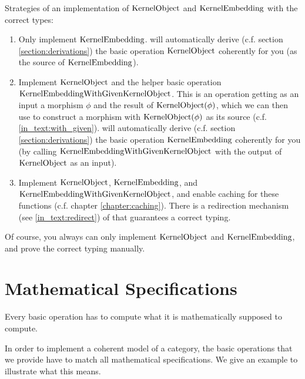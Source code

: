 \begin{example}
 Strategies of an implementation of $\mathrm{KernelObject}$ and $\mathrm{KernelEmbedding}$ with the correct types:
 \begin{enumerate}
  \item Only implement $\mathrm{KernelEmbedding}$. \CapPkg will automatically derive (c.f. section \ref{section:derivations}) the basic operation
        $\mathrm{KernelObject}$ coherently for you (as the source of $\mathrm{KernelEmbedding}$).
  \item Implement $\mathrm{KernelObject}$ and the helper basic operation $\mathrm{KernelEmbeddingWithGivenKernelObject}$.
        This is an operation getting as an input a morphism $\phi$ and the result of $\mathrm{KernelObject}( \phi )$,
        which we can then use to construct a morphism with $\mathrm{KernelObject}( \phi )$ as its source (c.f. \ref{in_text:with_given}).
        \CapPkg will automatically derive (c.f. section \ref{section:derivations}) the basic operation
        $\mathrm{KernelEmbedding}$ coherently for you (by calling $\mathrm{KernelEmbeddingWithGivenKernelObject}$ with the output of $\mathrm{KernelObject}$ as an input).
  \item Implement $\mathrm{KernelObject}$, $\mathrm{KernelEmbedding}$, and $\mathrm{KernelEmbeddingWithGivenKernelObject}$, and enable caching for these functions (c.f. chapter \ref{chapter:caching}).
        There is a redirection mechanism (see \ref{in_text:redirect}) of \CapPkg that guarantees a correct typing.
 \end{enumerate}
 Of course, you always can only implement $\mathrm{KernelObject}$ and $\mathrm{KernelEmbedding}$, and prove the correct typing manually.
\end{example}



\section{Mathematical Specifications}

\begin{specification}
 Every basic operation has to compute what it is mathematically supposed to compute.
\end{specification} 

In order to implement a coherent model of a category, the basic operations that we provide have to match all mathematical
specifications. We give an example to illustrate what this means.

